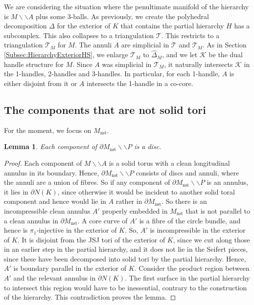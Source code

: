 \documentclass[oneside]{amsart}
\numberwithin{equation}{section}
\theoremstyle{plain}
\newtheorem{lemma}[equation]{Lemma}
\theoremstyle{definition}
\newcommand{\cut}{\backslash\backslash}
\begin{document}
We are considering the situation where the penultimate manifold of the hierarchy is $M \cut A$ plus some 3-balls.
As previously, we create the polyhedral decomposition $\Delta$ for the exterior of $K$ that
contains the partial hierarchy $H$ has a subcomplex. This also collapses to a triangulation
$\mathcal{T}$. This restricts to a triangulation
$\mathcal{T}_M$ for $M$. The annuli $A$ are simplicial in $\mathcal{T}$ and $\mathcal{T}_M$. 
As in Section \ref{Subsec:HierarchyExteriorHS}, we enlarge $\mathcal{T}_M$ to $\hat \Delta_M$, and we let $\mathcal{K}$
be the dual handle structure for $M$. Since $A$ was simplicial in $\mathcal{T}_M$, it naturally
intersects $\mathcal{K}$ in the 1-handles, 2-handles and 3-handles. In particular, for
each 1-handle, $A$ is either disjoint from it or $A$ intersects the 1-handle in a co-core.

\subsection{The components that are not solid tori} For the moment, we focus on $M_{\textrm{nst}}$.

\begin{lemma}
Each component of $\partial M_{\textrm{nst}} \cut P$ is a disc. 
\end{lemma}

\begin{proof}
Each component of
$M \cut A$ is a solid torus with a clean longitudinal annulus in its boundary. Hence, $\partial M_{\textrm{nst}} \cut P$
consists of discs and annuli, where the annuli are a union of fibres. So if any component of $\partial M_{\textrm{nst}} \cut P$
is an annulus, it lies in $\partial N(K)$, since otherwise it would be incident to another solid toral component and hence would lie in $A$
rather in $\partial M_{\textrm{nst}}$. So there is an incompressible clean annulus $A'$ properly embedded in $M_{\textrm{nst}}$
that is not parallel to a clean annulus in $\partial M_{\textrm{nst}}$. A core curve of $A'$ is a fibre of the circle bundle, and hence is
$\pi_1$-injective in the exterior of $K$. So, $A'$ is incompressible in the exterior of $K$. It is disjoint from
the JSJ tori of the exterior of $K$, since we cut along those in an earlier step in the partial hierarchy,
and it does not lie in the Seifert pieces, since these have been decomposed
into solid tori by the partial hierarchy. Hence, $A'$ is boundary parallel in the exterior of $K$. Consider the product
region between $A'$ and the relevant annulus in $\partial N(K)$. The first surface in the partial hierarchy to
intersect this region would have to be inessential, contrary to the construction of the hierarchy. This contradiction
proves the lemma.
\end{proof}
\end{document}

